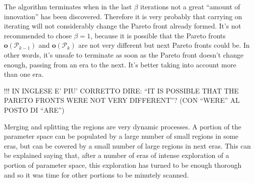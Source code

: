 \begin{rem}
\label{rem:termination}The algorithm terminates when in the last
$\beta$ iterations not a great ``amount of innovation'' has been
discovered. Therefore it is very probably that carrying on iterating
will not considerably change the Pareto front already formed. It's
not recommended to chose $\beta=1$, because it is possible that the
Pareto fronts $\mathbf{o}\left(\mathscr{P}_{k-1}\right)$ and $\mathbf{o}\left(\mathscr{P}_{k}\right)$
are not very different but next Pareto fronts could be. In other words,
it's unsafe to terminate as soon as the Pareto front doesn't change
enough, passing from an era to the next. It's better taking into account
more than one era.
\end{rem}
!!! IN INGLESE E' PIU' CORRETTO DIRE: ``IT IS POSSIBLE THAT THE PARETO
FRONTS WERE NOT VERY DIFFERENT''? (CON ``WERE'' AL POSTO DI ``ARE'')


\begin{rem}
Merging and splitting the regions are very dynamic processes. A portion
of the parameter space can be populated by a large number of small
regions in some eras, but can be covered by a small number of large
regions in next eras. This can be explained saying that, after a number
of eras of intense exploration of a portion of parameter space, this
exploration has turned to be enough thorough and so it was time for
other portions to be minutely scanned.
\end{rem}
